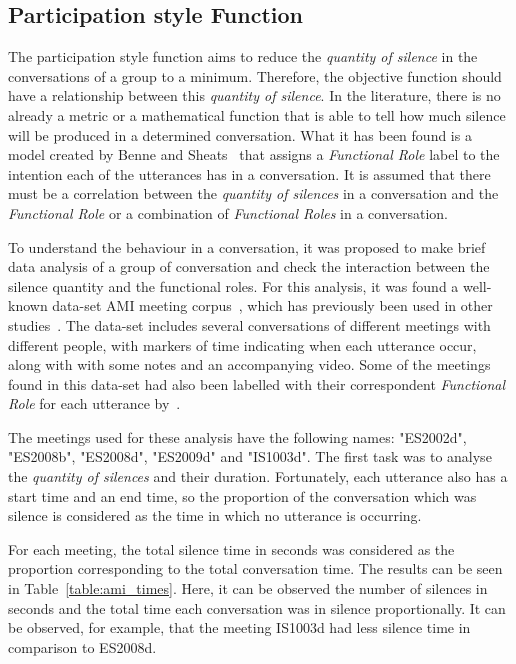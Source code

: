 \subsection{Participation style Function}

The participation style function aims to reduce the \textit{quantity of silence} in the conversations of a group to a minimum. Therefore, the objective function should have a relationship between this \textit{quantity of silence}. In the literature, there is no already a metric or a mathematical function that is able to tell how much silence will be produced in a determined conversation. What it has been found is a model created by Benne and Sheats~\cite{FunctionalRoles} that assigns a \textit{Functional Role} label to the intention each of the utterances has in a conversation. It is assumed that there must be a correlation between the \textit{quantity of silences} in a conversation and the \textit{Functional Role} or a combination of \textit{Functional Roles} in a conversation.

To understand the behaviour in a conversation, it was proposed to make brief data analysis of a group of conversation and check the interaction between the silence quantity and the functional roles. For this analysis, it was found a well-known data-set AMI meeting corpus~\cite{mccowan2005ami}, which has previously been used in other studies~\cite{dong2012modeling, Matsuyama2015Four-participantParticipant}. The data-set includes several conversations of different meetings with different people, with markers of time indicating when each utterance occur, along with with some notes and an accompanying video. Some of the meetings found in this data-set had also been labelled with their correspondent \textit{Functional Role} for each utterance by~\cite{dong2012modeling}.

The meetings used for these analysis have the following names: "ES2002d", "ES2008b", "ES2008d", "ES2009d" and "IS1003d". The first task was to analyse the \textit{quantity of silences} and their duration. Fortunately, each utterance also has a start time and an end time, so the proportion of the conversation which was silence is considered as the time in which no utterance is occurring.

For each meeting, the total silence time in seconds was considered as the proportion corresponding to the total conversation time. The results can be seen in Table~\ref{table:ami_times}. Here, it can be observed the number of silences in seconds and the total time each conversation was in silence proportionally. It can be observed, for example, that the meeting IS1003d had less silence time in comparison to ES2008d.

